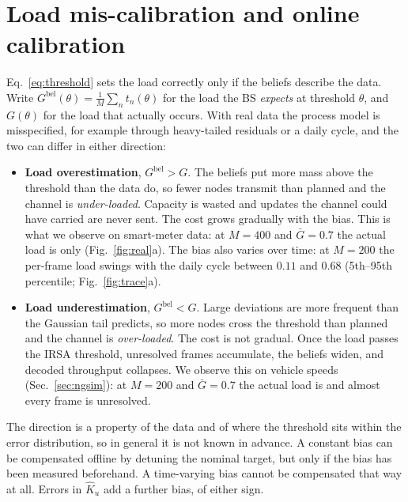 \documentclass[10pt]{article}
\theoremstyle{remark}
\theoremstyle{definition}
\newcommand{\Gb}{\bar G}
\newcommand{\Kh}{\hat K_u}
\begin{document}
\section{Load mis-calibration and online calibration}
Eq.~\eqref{eq:threshold} sets the load correctly only if the beliefs describe the data. Write
$G^{\mathrm{bel}}(\theta)=\frac1M\sum_n t_n(\theta)$ for the load the BS \emph{expects} at
threshold $\theta$, and $G(\theta)$ for the load that actually occurs. With real data the process
model is misspecified, for example through heavy-tailed residuals or a daily cycle, and the two can differ in
either direction:

\begin{itemize}
  \item \textbf{Load overestimation}, $G^{\mathrm{bel}}>G$. The beliefs put more mass
  above the threshold than the data do, so fewer nodes transmit than planned and the channel
  is \emph{under-loaded}. Capacity is wasted and updates the channel could have carried are never sent.
  The cost grows gradually with the bias. This is what we observe on smart-meter data: at $M=400$
  and $\Gb=0.7$ the actual load is only \realLoadEstFour{} (Fig.~\ref{fig:real}a). The bias
  also varies over time: at $M=200$ the per-frame load swings with the daily cycle between $0.11$ and
  $0.68$ (5th--95th percentile; Fig.~\ref{fig:trace}a).
  \item \textbf{Load underestimation}, $G^{\mathrm{bel}}<G$. Large deviations are more
  frequent than the Gaussian tail predicts, so more nodes cross the threshold than planned and the
  channel is \emph{over-loaded}. The cost is not gradual. Once the load passes the IRSA threshold,
  unresolved frames accumulate, the beliefs widen, and decoded throughput collapses. We
  observe this on vehicle speeds (Sec.~\ref{sec:ngsim}): at $M=200$ and $\Gb=0.7$ the
  actual load is \ngLoadCons{} and almost every frame is unresolved.
\end{itemize}
The direction is a property of the data and of where the threshold sits within the error
distribution, so in general it is not known in advance. A constant bias can be compensated
offline by detuning the nominal target, but only if the bias has been measured beforehand. A
time-varying bias cannot be compensated that way at all. Errors in $\Kh$ add a further bias,
of either sign.
\end{document}
